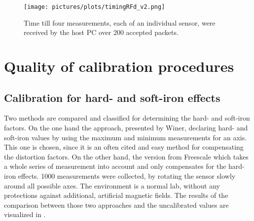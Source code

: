 \begin{figure}[h]
\centering
\texttt{[image: pictures/plots/timingRFd\_v2.png]}
\caption{Time till four measurements, each of an individual sensor, were received by the host PC over 200 accepted packets.}
\label{fig:sensTime}
\end{figure}



\section{Quality of calibration procedures} \label{sec:cali}

\subsection{Calibration for hard- and soft-iron effects}\label{subsec:resHardSoft}

Two methods are compared and classified for determining the hard- and soft-iron factors. On the one hand the approach, presented by Winer, declaring hard- and soft-iron values by using the maximum and minimum measurements for an axis. This one is chosen, since it is an often cited and easy method for compensating the distortion factors. On the other hand, the version from Freescale \cite{ozyagcilar2012calibrating} which takes a whole series of measurement into account and only compensates for the hard-iron effects. 1000 measurements were collected, by rotating the sensor slowly around all possible axes. The environment is a normal lab, without any protections against additional, artificial magnetic fields. The results of the comparison between those two approaches and the uncalibrated values are visualized in .

